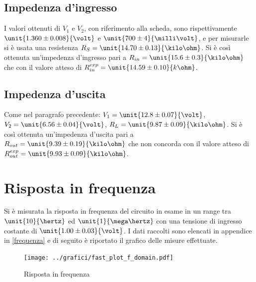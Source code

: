 \documentclass[10pt,a4paper]{article}
\begin{document}
\subsection{Impedenza d'ingresso}
I valori ottenuti di $V_1$ e $V_2$, con riferimento alla scheda, sono rispettivamente $\unit{1.360 \pm 0.008}{\volt}$ e $\unit{700 \pm 4}{\milli\volt}$, e per misurarle si è usata una resistenza $R_S = \unit{14.70 \pm 0.13}{\kilo\ohm}$.
Si è così ottenuta un'impedenza d'ingresso pari a $R_{in} = \unit{15.6 \pm 0.3}{\kilo\ohm}$ che   con il valore atteso di $R^{exp}_{in} = \unit{14.59 \pm 0.10}{k\ohm}$.

\subsection{Impedenza d'uscita}
Come nel paragrafo precedente: $V_1 = \unit{12.8 \pm 0.07}{\volt}$, $V_2 = \unit{6.56 \pm 0.04}{\volt}$, $R_L = \unit{9.87 \pm 0.09}{\kilo\ohm}$.
Si è così ottenuta un'impedenza d'uscita pari a $R_{out} = \unit{9.39 \pm 0.19}{\kilo\ohm}$ che non concorda con il valore atteso di $R_{out}^{exp} = \unit{9.93 \pm 0.09}{\kilo\ohm}$.

\section{Risposta in frequenza}

Si è misurata la risposta in frequenza del circuito in esame in un range tra $\unit{10}{\hertz}$ ed $\unit{1}{\mega\hertz}$ con una tensione di ingresso costante di $\unit{1.00 \pm 0.03}{\volt}$. I dati raccolti sono elencati in appendice in \tablename{\ref{frequenza}} e di seguito è riportato il grafico delle misure effettuate.

\begin{figure}[h!]
	\centering
		\texttt{[image: ../grafici/fast\_plot\_f\_domain.pdf]}
		\caption{Risposta in frequenza}
		\label{early}
\end{figure}
\end{document}
